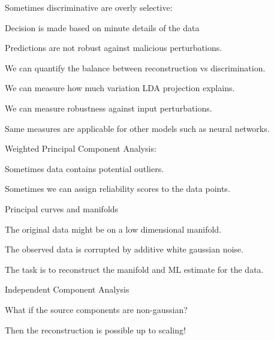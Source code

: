 \documentclass[landscape,footrule]{foils}
\begin{document}
Sometimes discriminative are overly selective:
\begin{triangles}
\item Decision is made based on minute details of the data
\item Predictions are not robust against malicious perturbations.\vspace*{1cm} 
\end{triangles}

We can quantify the balance between reconstruction vs discrimination. 
\begin{triangles}
\item We can measure how much variation LDA projection explains.
\item We can measure robustness against input perturbations. 
\item Same measures are applicable for other models such as neural networks.
\end{triangles} 







Weighted Principal Component Analysis:
\begin{triangles}
\item Sometimes data contains potential outliers.
\item Sometimes we can assign reliability scores to the data points. 
\end{triangles}\vspace*{1.0cm}

Principal curves and manifolds
\begin{triangles}
\item The original data might be on a low dimensional manifold. 
\item The observed data is corrupted by additive white gaussian noise. 
\item The task is to reconstruct the manifold and ML estimate for the data. 
\end{triangles}\vspace*{1.0cm}


Independent Component Analysis 
\begin{triangles}
\item What if the source components are non-gaussian? 
\item Then the reconstruction is possible up to scaling!
\end{triangles} 
\end{document}
